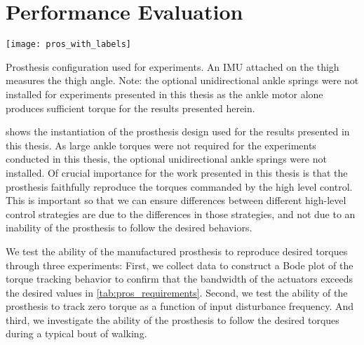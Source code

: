 \section{Performance Evaluation}\label{sec:pros_perf_eval}

\begin{marginfigure}[-1in]
\centerline{\texttt{[image: pros\_with\_labels]}}
\caption{Prosthesis configuration used for experiments. An IMU attached on the
thigh measures the thigh angle. Note: the optional unidirectional ankle springs
were not installed for experiments presented in this thesis as the ankle motor
alone produces sufficient torque for the results presented
herein.}\label{fig:prosthesis_actual}
\end{marginfigure}

 shows the instantiation of the prosthesis design
used for the results presented in this thesis. As large ankle torques were not
required for the experiments conducted in this thesis, the optional
unidirectional ankle springs were not installed. Of crucial importance for the
work presented in this thesis is that the prosthesis faithfully reproduce the
torques commanded by the high level control. This is important so that we can
ensure differences between different high-level control strategies are due to
the differences in those strategies, and not due to an inability of the
prosthesis to follow the desired behaviors.

We test the ability of the manufactured prosthesis to reproduce desired torques
through three experiments: First, we collect data to construct a Bode plot of
the torque tracking behavior to confirm that the bandwidth of the actuators
exceeds the desired values in \cref{tab:pros_requirements}.  Second, we test the
ability of the prosthesis to track zero torque as a function of input
disturbance frequency. And third, we investigate the ability of the prosthesis
to follow the desired torques during a typical bout of walking.

